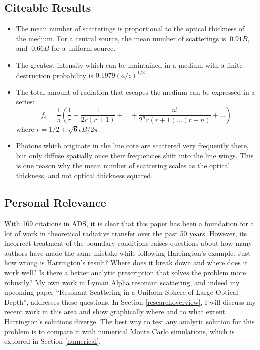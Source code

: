 \documentclass[onecolumn]{aastex63}
\begin{document}
\subsection{Citeable Results}
\begin{itemize}
    \item The mean number of scatterings is proportional to the optical thickness of the medium. For a central source, the mean number of scatterings is $~0.91B$, and $~0.66B$ for a uniform source.
    \item The greatest intensity which can be maintained in a medium with a finite destruction probability is $0.1979(a/\epsilon)^{1/3}$. 
    \item The total amount of radiation that escapes the medium can be expressed in a series:
    \begin{equation}
        f_e = \frac{1}{\pi}\left(\frac{1}{r} + \frac{1}{2r(r+1)} + ... + \frac{n!}{2^n r(r+1)...(r+n)}+...\right)
    \end{equation}
    where $r=1/2 + \sqrt{6}\epsilon B/2\pi$.
    \item Photons which originate in the line core are scattered very frequently there, but only diffuse spatially once their frequencies shift into the line wings. This is one reason why the mean number of scattering scales as the optical thickness, and not optical thickness squared.
\end{itemize}

\subsection{Personal Relevance}
With 169 citations in ADS, it is clear that this paper has been a foundation for a lot of work in theoretical radiative transfer over the past 50 years. However, its incorrect treatment of the boundary conditions raises questions about how many authors have made the same mistake while following Harrington's example. Just how wrong is Harrington's result? Where does it break down and where does it work well? Is there a better analytic prescription that solves the problem more robustly? My own work in Lyman Alpha resonant scattering, and indeed my upcoming paper ``Resonant Scattering in a Uniform Sphere of Large Optical Depth'', addresses these questions. In Section \ref{researchoverview}, I will discuss my recent work in this area and show graphically where and to what extent Harrington's solutions diverge. The best way to test any analytic solution for this problem is to compare it with numerical Monte Carlo simulations, which is explored in Section \ref{numerical}.
\end{document}
